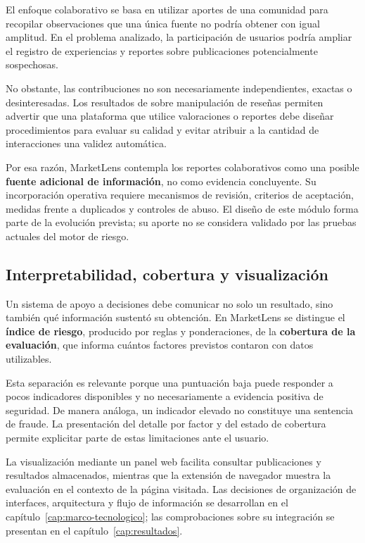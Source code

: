 El enfoque colaborativo se basa en utilizar aportes de una comunidad para recopilar observaciones que una única fuente no podría obtener con igual amplitud. En el problema analizado, la participación de usuarios podría ampliar el registro de experiencias y reportes sobre publicaciones potencialmente sospechosas.

No obstante, las contribuciones no son necesariamente independientes, exactas o desinteresadas. Los resultados de \textcite{ml-hu-2011} sobre manipulación de reseñas permiten advertir que una plataforma que utilice valoraciones o reportes debe diseñar procedimientos para evaluar su calidad y evitar atribuir a la cantidad de interacciones una validez automática.

Por esa razón, MarketLens contempla los reportes colaborativos como una posible \textbf{fuente adicional de información}, no como evidencia concluyente. Su incorporación operativa requiere mecanismos de revisión, criterios de aceptación, medidas frente a duplicados y controles de abuso. El diseño de este módulo forma parte de la evolución prevista; su aporte no se considera validado por las pruebas actuales del motor de riesgo.

\subsection{Interpretabilidad, cobertura y visualización}\label{subsec:ml-fundamento-interpretabilidad}

Un sistema de apoyo a decisiones debe comunicar no solo un resultado, sino también qué información sustentó su obtención. En MarketLens se distingue el \textbf{índice de riesgo}, producido por reglas y ponderaciones, de la \textbf{cobertura de la evaluación}, que informa cuántos factores previstos contaron con datos utilizables.

Esta separación es relevante porque una puntuación baja puede responder a pocos indicadores disponibles y no necesariamente a evidencia positiva de seguridad. De manera análoga, un indicador elevado no constituye una sentencia de fraude. La presentación del detalle por factor y del estado de cobertura permite explicitar parte de estas limitaciones ante el usuario.

La visualización mediante un panel web facilita consultar publicaciones y resultados almacenados, mientras que la extensión de navegador muestra la evaluación en el contexto de la página visitada. Las decisiones de organización de interfaces, arquitectura y flujo de información se desarrollan en el capítulo~\ref{cap:marco-tecnologico}; las comprobaciones sobre su integración se presentan en el capítulo~\ref{cap:resultados}.

